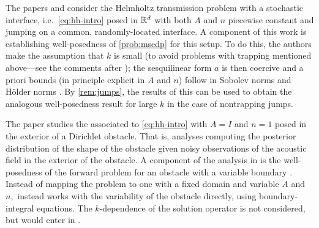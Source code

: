 The papers \cite{HiScScSc:15} and \cite{Sc:17} consider the Helmholtz transmission problem with a stochastic interface, i.e.~\eqref{eq:hh-intro} posed in $\mathbb R^{d}$ with both $A$ and $n$ piecewise constant and jumping on a common, randomly-located interface. A component of this work is establishing well-posedness of \cref{prob:msedp} for this setup. To do this, the authors make the assumption that $k$ is small (to avoid problems with trapping mentioned above---see the comments after \cite[Theorem 4.3]{HiScScSc:15}); the sesquilinear form $a$ is then coercive and a priori bounds (in principle explicit in $A$ and $n$) follow in Sobolev norms \cite[Lemma 4.5]{HiScScSc:15} and H\"older norms \cite[Theorem 5.1 and Corollary 5.2]{Sc:17}. By \cref{rem:jumps}, the results of this  can be used to obtain the analogous well-posedness result for large $k$ in the case of nontrapping jumps.

The paper \cite{BuGh:14} studies the  associated to \eqref{eq:hh-intro} with $A=I$ and $n=1$  posed in the  exterior of a Dirichlet obstacle. That is, \cite{BuGh:14} analyses computing the posterior distribution of the shape of the obstacle given noisy observations of the acoustic field in the exterior of the obstacle. A component of the analysis in \cite{BuGh:14} is the well-posedness of the forward problem for an obstacle with a variable boundary \cite[Proposition 3.5]{BuGh:14}. Instead of mapping the problem to one with  a fixed domain and variable $A$ and $n,$ \cite{BuGh:14} instead works with the variability of the obstacle directly, using boundary-integral equations. The $k$-dependence of the solution operator is not considered, but would enter in \cite[Lemma 3.1]{BuGh:14}.


